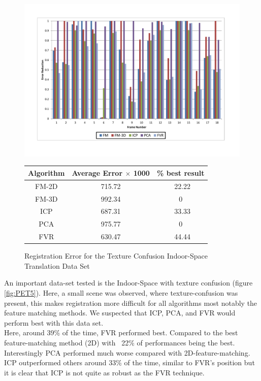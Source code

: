\begin{figure}
\centering
\includegraphics[width=6in]{images/results/IndoorSpace_texture_confusion_translation}
\caption{Registration Error for the Texture Confusion Indoor-Space Translation Data Set}
\label{fig:PET5}

\begin{tabular}{ccc}
\hline
\textbf{Algorithm} & \textbf{Average Error $\times$ 1000} & \textbf{\% best result}\\ \hline
FM-2D	& 715.72 & ~22.22\\
FM-3D	& 992.34 & 0\\
ICP		& 687.31 & ~33.33\\
PCA		& 975.77 & 0\\
FVR		& 630.47 & ~44.44\\
\end{tabular}
\label{tab:PET5ST}
\end{figure} 


An important data-set tested is the Indoor-Space with texture confusion (figure \ref{fig:PET5}). Here, a small scene was observed, where texture-confusion was present, this makes registration more difficult for all algorithms most notably the feature matching methods. We suspected that ICP, PCA, and FVR would perform best with this data set. \\

Here, around 39\% of the time, FVR performed best. Compared to the best feature-matching method (2D) with ~22\% of performances being the best. Interestingly PCA performed much worse compared with 2D-feature-matching. ICP outperformed others around 33\% of the time, similar to FVR's position but it is clear that ICP is not quite as robust as the FVR technique. \\ 


